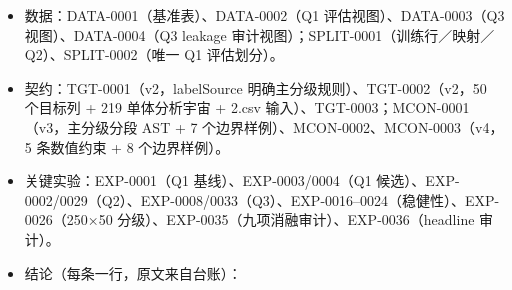 \documentclass[
  11pt,
]{article}
\providecommand{\tightlist}{%
  \setlength{\itemsep}{0pt}\setlength{\parskip}{0pt}}
\begin{document}
\begin{itemize}
\tightlist
\item
  数据：DATA-0001（基准表）、DATA-0002（Q1 评估视图）、DATA-0003（Q3
  视图）、DATA-0004（Q3 leakage
  审计视图）；SPLIT-0001（训练行／映射／Q2）、SPLIT-0002（唯一 Q1
  评估划分）。
\item
  契约：TGT-0001（v2，labelSource 明确主分级规则）、TGT-0002（v2，50
  个目标列 + 219 单体分析宇宙 + 2.csv
  输入）、TGT-0003；MCON-0001（v3，主分级分段 AST + 7
  个边界样例）、MCON-0002、MCON-0003（v4，5 条数值约束 + 8
  个边界样例）。
\item
  关键实验：EXP-0001（Q1 基线）、EXP-0003/0004（Q1
  候选）、EXP-0002/0029（Q2）、EXP-0008/0033（Q3）、EXP-0016--0024（稳健性）、EXP-0026（250×50
  分级）、EXP-0035（九项消融审计）、EXP-0036（headline 审计）。
\item
  结论（每条一行，原文来自台账）：


\end{itemize}
\end{document}
